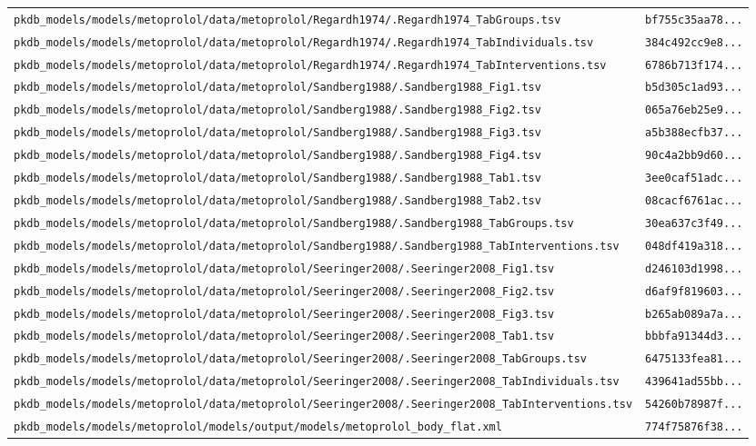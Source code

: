 \begin{longtable}{ll}
\texttt{pkdb\_models/models/metoprolol/data/metoprolol/Regardh1974/.Regardh1974\_TabGroups.tsv} & \texttt{bf755c35aa78...} \\
\texttt{pkdb\_models/models/metoprolol/data/metoprolol/Regardh1974/.Regardh1974\_TabIndividuals.tsv} & \texttt{384c492cc9e8...} \\
\texttt{pkdb\_models/models/metoprolol/data/metoprolol/Regardh1974/.Regardh1974\_TabInterventions.tsv} & \texttt{6786b713f174...} \\
\texttt{pkdb\_models/models/metoprolol/data/metoprolol/Sandberg1988/.Sandberg1988\_Fig1.tsv} & \texttt{b5d305c1ad93...} \\
\texttt{pkdb\_models/models/metoprolol/data/metoprolol/Sandberg1988/.Sandberg1988\_Fig2.tsv} & \texttt{065a76eb25e9...} \\
\texttt{pkdb\_models/models/metoprolol/data/metoprolol/Sandberg1988/.Sandberg1988\_Fig3.tsv} & \texttt{a5b388ecfb37...} \\
\texttt{pkdb\_models/models/metoprolol/data/metoprolol/Sandberg1988/.Sandberg1988\_Fig4.tsv} & \texttt{90c4a2bb9d60...} \\
\texttt{pkdb\_models/models/metoprolol/data/metoprolol/Sandberg1988/.Sandberg1988\_Tab1.tsv} & \texttt{3ee0caf51adc...} \\
\texttt{pkdb\_models/models/metoprolol/data/metoprolol/Sandberg1988/.Sandberg1988\_Tab2.tsv} & \texttt{08cacf6761ac...} \\
\texttt{pkdb\_models/models/metoprolol/data/metoprolol/Sandberg1988/.Sandberg1988\_TabGroups.tsv} & \texttt{30ea637c3f49...} \\
\texttt{pkdb\_models/models/metoprolol/data/metoprolol/Sandberg1988/.Sandberg1988\_TabInterventions.tsv} & \texttt{048df419a318...} \\
\texttt{pkdb\_models/models/metoprolol/data/metoprolol/Seeringer2008/.Seeringer2008\_Fig1.tsv} & \texttt{d246103d1998...} \\
\texttt{pkdb\_models/models/metoprolol/data/metoprolol/Seeringer2008/.Seeringer2008\_Fig2.tsv} & \texttt{d6af9f819603...} \\
\texttt{pkdb\_models/models/metoprolol/data/metoprolol/Seeringer2008/.Seeringer2008\_Fig3.tsv} & \texttt{b265ab089a7a...} \\
\texttt{pkdb\_models/models/metoprolol/data/metoprolol/Seeringer2008/.Seeringer2008\_Tab1.tsv} & \texttt{bbbfa91344d3...} \\
\texttt{pkdb\_models/models/metoprolol/data/metoprolol/Seeringer2008/.Seeringer2008\_TabGroups.tsv} & \texttt{6475133fea81...} \\
\texttt{pkdb\_models/models/metoprolol/data/metoprolol/Seeringer2008/.Seeringer2008\_TabIndividuals.tsv} & \texttt{439641ad55bb...} \\
\texttt{pkdb\_models/models/metoprolol/data/metoprolol/Seeringer2008/.Seeringer2008\_TabInterventions.tsv} & \texttt{54260b78987f...} \\
\texttt{pkdb\_models/models/metoprolol/models/output/models/metoprolol\_body\_flat.xml} & \texttt{774f75876f38...} \\
\end{longtable}

